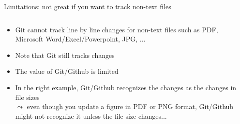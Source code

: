 \documentclass[handout,pdftex,10pt,aspectratio=169]{beamer}
\begin{document}
\begin{frame}[fragile]{Limitations: not great if you want to track non-text files}
  \begin{columns}[c]
    \begin{column}{0.46\linewidth}
      \begin{itemize}[<+->]\setlength\itemsep{10pt}
        \item Git cannot track line by line changes for non-text files such as
        PDF, Microsoft Word/Excel/Powerpoint, JPG, ...
        \item Note that Git still tracks changes
        \item The value of Git/Github is limited
        \medskip
        \item In the right example, Git/Github recognizes the changes as the changes in file sizes\\
        $\leadsto$ even though you update a figure in PDF or PNG format,
        Git/Github might not recognize it unless the file size changes...
      \end{itemize}
    \end{column} \hfill
    \begin{column}{0.53\linewidth}
      \centering
    \end{column}
  \end{columns}
\end{frame}
\end{document}
